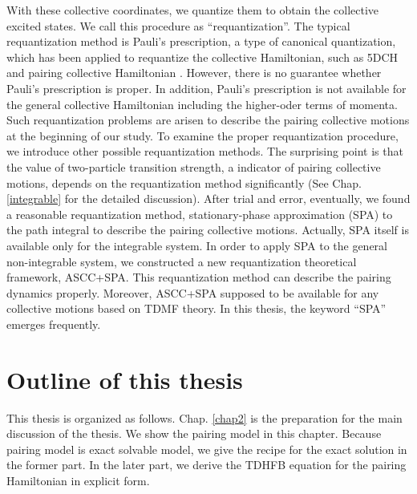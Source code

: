 \documentclass[11pt]{book} %
\begin{document}
With these collective coordinates, we quantize them to obtain the collective excited states. We call this procedure as ``requantization''. The typical requantization method is Pauli's prescription, a type of canonical quantization, which has been applied to requantize the collective Hamiltonian, such as 5DCH \cite{KB67} and pairing collective Hamiltonian \cite{BBPK70}. However, there is no guarantee whether Pauli's prescription is proper. In addition, Pauli's prescription is not available for the general collective Hamiltonian including the higher-oder terms of momenta. 
Such requantization problems are arisen to describe the pairing collective motions at the beginning of our study. 
To examine the proper requantization procedure, we introduce other possible requantization methods. The surprising point is that the value of two-particle transition strength, a indicator of pairing collective motions, depends on the requantization method significantly (See Chap. \ref{integrable} for the detailed discussion).
After trial and error, eventually, we found a reasonable requantization method, stationary-phase approximation (SPA) to the path integral to describe the pairing collective motions. 
Actually, SPA itself is available only for the integrable system. In order to apply SPA to the general non-integrable system, we constructed a new requantization theoretical framework, ASCC+SPA. This requantization method can describe the pairing dynamics properly. Moreover, ASCC+SPA supposed to be available for any collective motions based on TDMF theory. In this thesis, the keyword ``SPA'' emerges frequently.



\section{Outline of this thesis}
This thesis is organized as follows. Chap. \ref{chap2} is the preparation for the main discussion of the thesis. We show the pairing model in this chapter. Because pairing model is exact solvable model, we give the recipe for the exact solution in the former part. In the later part, we derive the TDHFB equation for the pairing Hamiltonian in explicit form. 
\end{document}
